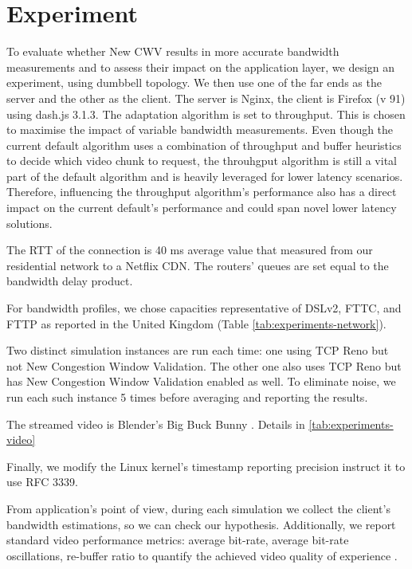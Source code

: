 \documentclass[10pt,sigconf]{acmart}
\begin{document}
\hspace{3in}

\section{Experiment}

To evaluate whether New CWV results in more accurate bandwidth measurements and to assess their impact on the application layer, we design an experiment, using dumbbell topology. We then use one of the far ends as the server and the other as the client. The server is Nginx, the client is Firefox (v 91) using dash.js 3.1.3. The adaptation algorithm is set to throughput. This is chosen to maximise the impact of variable bandwidth measurements. Even though the current default algorithm uses a combination of throughput and buffer heuristics to decide which video chunk to request, the throuhgput algorithm is still a vital part of the default algorithm and is heavily leveraged for lower latency scenarios. Therefore, influencing the throughput algorithm's performance also has a direct impact on the current default's performance and could span novel lower latency solutions.

The RTT of the connection is 40 ms average value that measured from our residential network to a Netflix CDN. The routers' queues are set equal to the bandwidth delay product.

For bandwidth profiles, we chose capacities representative of DSLv2, FTTC, and FTTP as reported in the United Kingdom \cite{online-ofcom-report} (Table \ref{tab:experiments-network}).

Two distinct simulation instances are run each time: one using TCP Reno but not New Congestion Window Validation. The other one also uses TCP Reno but has New Congestion Window Validation enabled as well. To eliminate noise, we run each such instance 5 times before averaging and reporting the results.

The streamed video is Blender's Big Buck Bunny \cite{online-bbb}. Details in \ref{tab:experiments-video}

Finally, we modify the Linux kernel's timestamp reporting precision instruct it to use RFC 3339.

From application's point of view, during each simulation we collect the client's bandwidth estimations, so we can check our hypothesis. Additionally, we report standard video performance metrics: average bit-rate, average bit-rate oscillations, re-buffer ratio to quantify the achieved video quality of experience \cite{Spiteri-2019-from-theory-to-practice-sabre, Yin-2015-a-control-theoritic-approach, Dobrian-2013-understanding-the-impact-of-video-quality}.
\end{document}
